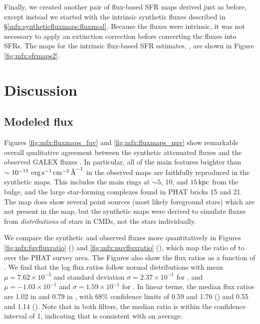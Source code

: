 \documentclass[iop, tighten]{emulateapj}
\begin{document}
Finally, we created another pair of flux-based SFR maps derived just as before,
except instead we started with the intrinsic synthetic fluxes \fxsfhz{}
described in \S \ref{mfx:syntheticfluxmaps:fluxmod}. Because the fluxes were
intrinsic, it was not necessary to apply an extinction correction before
converting the fluxes into SFRs. The maps for the intrinsic flux-based SFR
estimates, \sfrxz{}, are shown in Figure \ref{fig:mfx:sfrmaps2}.




\section{Discussion}\label{mfx:discussion}



\subsection{Modeled flux}\label{mfx:discussion:modflux}

Figures \ref{fig:mfx:fluxmaps_fuv} and \ref{fig:mfx:fluxmaps_nuv} show
remarkable overall qualitative agreement between the synthetic attenuated
fluxes \fxsfh{} and the observed GALEX fluxes \fxobs{}. In particular, all of
the main features brighter than $\sim 10^{-15}\, \,\mathrm{erg}\,\mathrm{s}^{-1}\,\mathrm{cm}^{-2}\,\textrm{\AA}^{-1}$ in the observed maps
are faithfully reproduced in the synthetic maps. This includes the main rings
at $\sim 5$, 10, and $15\,\mathrm{kpc}$ from the bulge, and the large star-forming
complexes found in PHAT bricks 15 and 21. The \fnuvobs{} map does show several
point sources (most likely foreground stars) which are not present in the
\fnuvsfh{} map, but the synthetic maps were derived to simulate fluxes from
\emph{distributions} of stars in CMDs, not the stars individually.

We compare the synthetic and observed fluxes more quantitatively in Figures
\ref{fig:mfx:fuvfluxratio} (\fuv{}) and \ref{fig:mfx:nuvfluxratio} (\nuv{}),
which map the ratio of \fxsfh{} to \fxobs{} over the PHAT survey area. The
Figures also show the flux ratios as a function of \fxobs{}. We find that the
log flux ratios follow normal distributions with mean $\mu = 7.62\times
10^{-3}$ and standard deviation $\sigma = 2.37\times 10^{-1}$ for \fuv{}, and
$\mu = -1.03\times 10^{-1}$ and $\sigma = 1.59\times 10^{-1}$ for \nuv{}. In
linear terms, the median flux ratios are 1.02 in \fuv{} and 0.79 in \nuv{},
with 68\% confidence limits of 0.59 and 1.76 (\fuv{}) and 0.55 and 1.14
(\nuv{}). Note that in both filters, the median ratio is within the confidence
interval of 1, indicating that \fxsfh{} is consistent with \fxobs{} on average.
\end{document}
